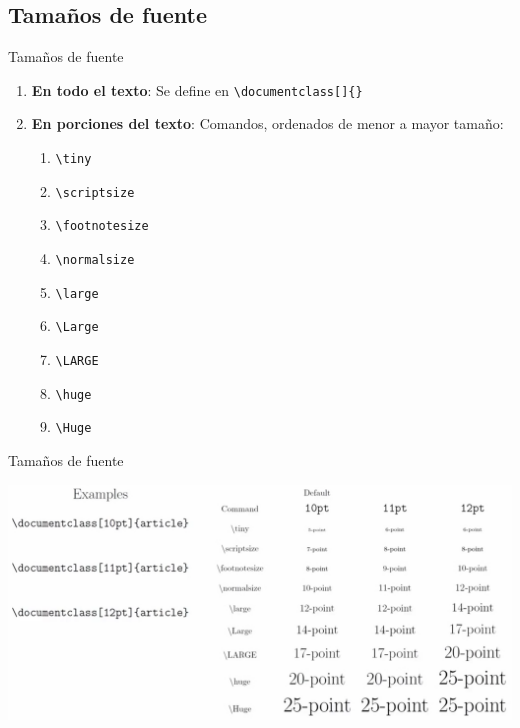\documentclass[../slides.tex]{subfiles}
\begin{document}
    \begin{frame}
        \tableofcontents[sections=\value{section}]
    \end{frame}
    
    \subsection{Tamaños de fuente}
    \begin{frame}{Tamaños de fuente}
        \begin{enumerate}
            \item \textbf{En todo el texto}: Se define en \texttt{\textbackslash documentclass[]\{\}}

            \item \textbf{En porciones del texto}:
                Comandos, ordenados de menor a mayor tamaño:
                \begin{enumerate}
                    \item \texttt{\textbackslash tiny}
                    \item \texttt{\textbackslash scriptsize}
                    \item \texttt{\textbackslash footnotesize}
                    \item \texttt{\textbackslash normalsize}
                    \item \texttt{\textbackslash large}
                    \item \texttt{\textbackslash Large}
                    \item \texttt{\textbackslash LARGE}
                    \item \texttt{\textbackslash huge}
                    \item \texttt{\textbackslash Huge}
                \end{enumerate}
                
        \end{enumerate}
    \end{frame}
    
    \begin{frame}{Tamaños de fuente}
        \begin{center}
            \includegraphics[scale=0.25]{sizes}
        \end{center}
    \end{frame}
    
\end{document}
